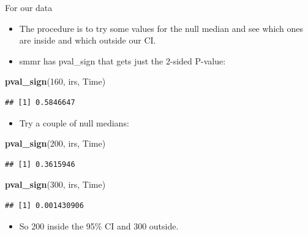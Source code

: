 \documentclass[
  ignorenonframetext,
]{beamer}
\newenvironment{Shaded}{\begin{snugshade}}{\end{snugshade}}
\newcommand{\DecValTok}[1]{\textcolor[rgb]{0.00,0.00,0.81}{#1}}
\newcommand{\KeywordTok}[1]{\textcolor[rgb]{0.13,0.29,0.53}{\textbf{#1}}}
\newcommand{\NormalTok}[1]{#1}
\providecommand{\tightlist}{%
  \setlength{\itemsep}{0pt}\setlength{\parskip}{0pt}}
\begin{document}
\begin{frame}[fragile]{For our data}
\protect\hypertarget{for-our-data}{}

\begin{itemize}
\tightlist
\item
  The procedure is to try some values for the null median and see which
  ones are inside and which outside our CI.
\item
  smmr has pval\_sign that gets just the 2-sided P-value:
\end{itemize}

\begin{Shaded}
\begin{Highlighting}[]
\KeywordTok{pval_sign}\NormalTok{(}\DecValTok{160}\NormalTok{, irs, Time)}
\end{Highlighting}
\end{Shaded}

\begin{verbatim}
## [1] 0.5846647
\end{verbatim}

\begin{itemize}
\tightlist
\item
  Try a couple of null medians:
\end{itemize}

\begin{Shaded}
\begin{Highlighting}[]
\KeywordTok{pval_sign}\NormalTok{(}\DecValTok{200}\NormalTok{, irs, Time)}
\end{Highlighting}
\end{Shaded}

\begin{verbatim}
## [1] 0.3615946
\end{verbatim}

\begin{Shaded}
\begin{Highlighting}[]
\KeywordTok{pval_sign}\NormalTok{(}\DecValTok{300}\NormalTok{, irs, Time)}
\end{Highlighting}
\end{Shaded}

\begin{verbatim}
## [1] 0.001430906
\end{verbatim}

\begin{itemize}
\tightlist
\item
  So 200 inside the 95\% CI and 300 outside.
\end{itemize}

\end{frame}
\end{document}
